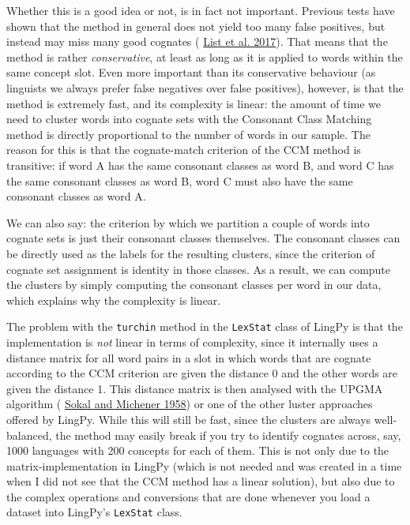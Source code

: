 \documentclass[
  a4paper,
  14pt,
  oneside,
  tablecaptionabove
]{scrbook}
\begin{document}
Whether this is a good idea or not, is in fact not important. Previous
tests have shown that the method in general does not yield too many
false positives, but instead may miss many good cognates (
\href{http://bibliography.lingpy.org?key=List2017c}{List et al. 2017}).
That means that the method is rather \emph{conservative}, at least as
long as it is applied to words within the same concept slot. Even more
important than its conservative behaviour (as linguists we always prefer
false negatives over false positives), however, is that the method is
extremely fast, and its complexity is linear: the amount of time we need
to cluster words into cognate sets with the Consonant Class Matching
method is directly proportional to the number of words in our sample.
The reason for this is that the cognate-match criterion of the CCM
method is transitive: if word A has the same consonant classes as word
B, and word C has the same consonant classes as word B, word C must also
have the same consonant classes as word A.

We can also say: the criterion by which we partition a couple of words
into cognate sets is just their consonant classes themselves. The
consonant classes can be directly used as the labels for the resulting
clusters, since the criterion of cognate set assignment is identity in
those classes. As a result, we can compute the clusters by simply
computing the consonant classes per word in our data, which explains why
the complexity is linear.

The problem with the \lstinline!turchin! method in the
\lstinline!LexStat! class of LingPy is that the implementation is
\emph{not} linear in terms of complexity, since it internally uses a
distance matrix for all word pairs in a slot in which words that are
cognate according to the CCM criterion are given the distance 0 and the
other words are given the distance 1. This distance matrix is then
analysed with the UPGMA algorithm (
\href{http://bibliography.lingpy.org?key=Sokal1958}{Sokal and Michener
1958}) or one of the other luster approaches offered by LingPy. While
this will still be fast, since the clusters are always well-balanced,
the method may easily break if you try to identify cognates across, say,
1000 languages with 200 concepts for each of them. This is not only due
to the matrix-implementation in LingPy (which is not needed and was
created in a time when I did not see that the CCM method has a linear
solution), but also due to the complex operations and conversions that
are done whenever you load a dataset into LingPy's \lstinline!LexStat!
class.
\end{document}
